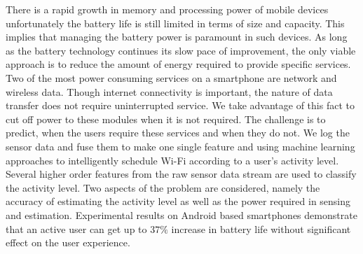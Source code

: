 There is a rapid growth in memory and processing power of mobile devices unfortunately the battery life is still limited in terms of size and capacity. This implies that managing the battery power is paramount in such devices. As long as the battery technology continues its slow pace of improvement, the only viable approach is to reduce the amount of energy required to provide specific services. Two of the most power consuming services on a smartphone are network and wireless data. Though internet connectivity is important, the nature of data transfer does not require uninterrupted service. We take advantage of this fact to cut off power to these modules when it is not required. The challenge is to predict, when the users require these services and when they do not. We log the sensor data and fuse them to make one single feature and using machine learning approaches to intelligently schedule Wi-Fi according to a user’s activity level. Several higher order features from the raw sensor data stream are used to classify
the activity level. Two aspects of the problem are considered, namely the accuracy of estimating the activity level as well as the power required in sensing and estimation. Experimental results on Android based smartphones demonstrate that an active user can get up to $37\%$ increase in battery life without significant effect on the user experience.